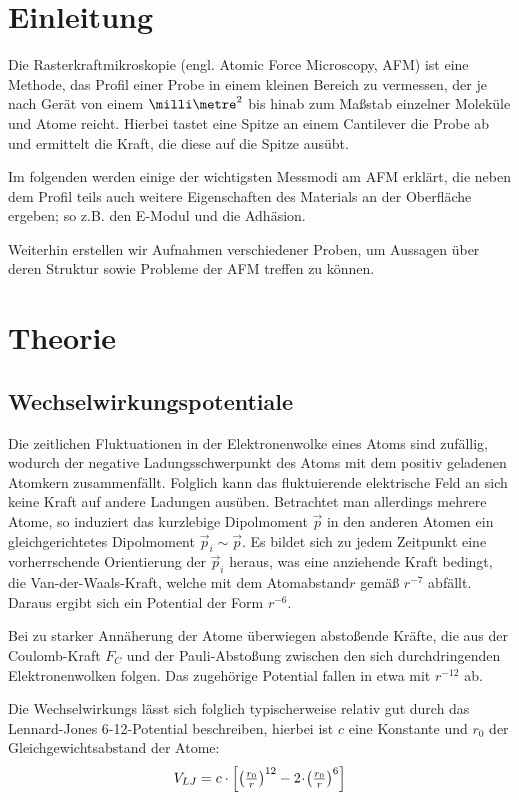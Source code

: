 
\section{Einleitung}
Die Rasterkraftmikroskopie (engl. Atomic Force Microscopy, AFM) ist eine Methode, das Profil einer Probe in einem kleinen Bereich zu vermessen, der je nach Gerät von einem $\milli\metre^2$ bis hinab zum Maßstab einzelner Moleküle und Atome reicht. Hierbei tastet eine Spitze an einem Cantilever die Probe ab und ermittelt die Kraft, die diese auf die Spitze ausübt.

Im folgenden werden einige der wichtigsten Messmodi am AFM erklärt, die neben dem Profil teils auch weitere Eigenschaften des Materials an der Oberfläche ergeben; so z.B. den E-Modul und die Adhäsion.

Weiterhin erstellen wir Aufnahmen verschiedener Proben, um Aussagen über deren Struktur sowie Probleme der AFM treffen zu können. 

\newpage
\section{Theorie}
\subsection{Wechselwirkungspotentiale}
Die zeitlichen Fluktuationen in der Elektronenwolke eines Atoms sind zufällig, wodurch der negative Ladungsschwerpunkt des Atoms mit dem positiv geladenen Atomkern zusammenfällt. Folglich kann das fluktuierende elektrische Feld an sich keine Kraft auf andere Ladungen ausüben. Betrachtet man allerdings mehrere Atome, so induziert das kurzlebige Dipolmoment $\vec p$ in den anderen Atomen ein gleichgerichtetes Dipolmoment $\vec p_i \sim \vec p$. Es bildet sich zu jedem Zeitpunkt eine  vorherrschende Orientierung der $\vec p_i$ heraus, was eine anziehende Kraft bedingt, die Van-der-Waals-Kraft, welche mit dem Atomabstand$r$ gemäß $r^{-7}$ abfällt. Daraus ergibt sich ein Potential der Form $r^{-6}$.

Bei zu starker Annäherung der Atome überwiegen abstoßende Kräfte, die aus der Coulomb-Kraft $F_C$ und der Pauli-Abstoßung zwischen den sich durchdringenden Elektronenwolken folgen. Das zugehörige Potential fallen in etwa mit $r^{-12}$ ab.

Die Wechselwirkungs lässt sich folglich typischerweise relativ gut durch das Lennard-Jones 6-12-Potential beschreiben, hierbei ist $c$ eine Konstante und $r_0$ der Gleichgewichtsabstand der Atome:
\begin{equation}
  V_{LJ} = c \cdot \left[ \left(\tfrac{r_0}{r}\right)^{12} - 2 \!\cdot\! \left(\tfrac{r_0}{r}\right)^{6} \right]
\end{equation}

